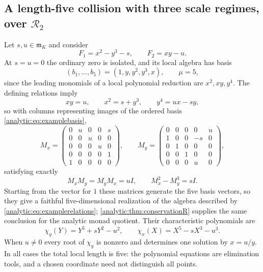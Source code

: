 \documentclass[11pt,letterpaper]{article}
\theoremstyle{definition}
\theoremstyle{remark}
\newcommand{\RR}{\mathscr R}
\newcommand{\m}{\mathfrak m}
\numberwithin{equation}{section}
\begin{document}
\subsection{A length-five collision with three scale regimes, over $\RR_2$}
\label{analytic:subsec:length-five}
Let $s,u\in\m_K$ and consider
\begin{equation}\label{analytic:eq:exampleF}
 F_1=x^2-y^3-s,\qquad F_2=xy-u .
\end{equation}
At $s=u=0$ the ordinary zero is isolated, and its local algebra has basis
\begin{equation}\label{analytic:eq:examplebasis}
 (b_1,\ldots,b_5)=(1,y,y^2,y^3,x),\qquad\mu=5 ,
\end{equation}
since the leading monomials of a local polynomial reduction are
$x^2,xy,y^4$. The defining relations imply
\begin{equation}\label{analytic:eq:examplerelations}
 xy=u,\qquad x^2=s+y^3,\qquad y^4=ux-sy ,
\end{equation}
so with columns representing images of the ordered basis
\eqref{analytic:eq:examplebasis},
\begin{equation}\label{analytic:eq:examplematrices}
 M_x=\begin{pmatrix}
 0&u&0&0&s\\0&0&u&0&0\\0&0&0&u&0\\0&0&0&0&1\\1&0&0&0&0
 \end{pmatrix},\qquad
 M_y=\begin{pmatrix}
 0&0&0&0&u\\1&0&0&-s&0\\0&1&0&0&0\\0&0&1&0&0\\0&0&0&u&0
 \end{pmatrix},
\end{equation}
satisfying exactly
\begin{equation}\label{analytic:eq:matrixidentities}
 M_xM_y=M_yM_x=uI,\qquad M_x^2-M_y^3=sI .
\end{equation}
Starting from the vector for $1$ these matrices generate the five basis
vectors, so they give a faithful five-dimensional realization of the algebra
described by \eqref{analytic:eq:examplerelations};
\cref{analytic:thm:conservationR} supplies the same conclusion for the
analytic monad quotient. Their characteristic polynomials are
\begin{equation}\label{analytic:eq:characteristicexample}
 \chi_y(Y)=Y^5+sY^2-u^2,\qquad \chi_x(X)=X^5-sX^3-u^3 .
\end{equation}
When $u\ne0$ every root of $\chi_y$ is nonzero and determines one solution
by $x=u/y$. In all cases the total local length is five: the polynomial
equations are elimination tools, and a chosen coordinate need not
distinguish all points.
\end{document}
